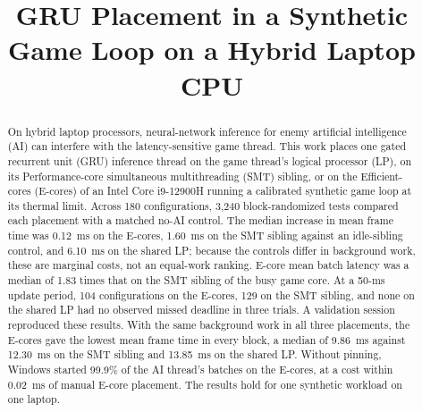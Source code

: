 \documentclass[conference]{IEEEtran}
\begin{document}
\title{GRU Placement in a Synthetic Game Loop on a Hybrid Laptop CPU}

\author{
\and
{}
\and
{}
}

\maketitle

\begin{abstract}
On hybrid laptop processors, neural-network inference for enemy artificial intelligence (AI) can interfere with the latency-sensitive game thread. This work places one gated recurrent unit (GRU) inference thread on the game thread's logical processor (LP), on its Performance-core simultaneous multithreading (SMT) sibling, or on the Efficient-cores (E-cores) of an Intel Core i9-12900H running a calibrated synthetic game loop at its thermal limit. Across 180 configurations, 3,240 block-randomized tests compared each placement with a matched no-AI control. The median increase in mean frame time was 0.12~ms on the E-cores, 1.60~ms on the SMT sibling against an idle-sibling control, and 6.10~ms on the shared LP; because the controls differ in background work, these are marginal costs, not an equal-work ranking. E-core mean batch latency was a median of 1.83 times that on the SMT sibling of the busy game core. At a 50-ms update period, 104 configurations on the E-cores, 129 on the SMT sibling, and none on the shared LP had no observed missed deadline in three trials. A validation session reproduced these results. With the same background work in all three placements, the E-cores gave the lowest mean frame time in every block, a median of 9.86~ms against 12.30~ms on the SMT sibling and 13.85~ms on the shared LP. Without pinning, Windows started 99.9\% of the AI thread's batches on the E-cores, at a cost within 0.02~ms of manual E-core placement. The results hold for one synthetic workload on one laptop.
\end{abstract}
\end{document}
